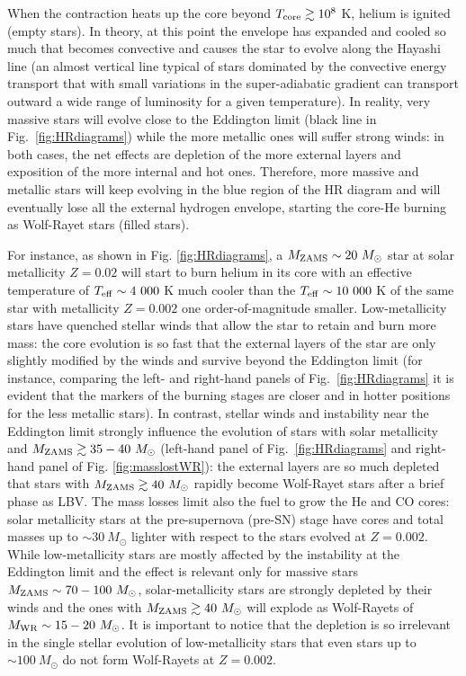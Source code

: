 \documentclass[a4paper,titlepage]{book}     	%
\newcommand{\sun}{\ensuremath{_\odot}}
\newcommand{\mzams}{M_\textup{ZAMS}}
\newcommand{\msun}{\ensuremath{M\sun}}
\begin{document}
When the contraction heats up the core beyond $T_{\rm core} \gtrsim 10^{8}$ K, helium is ignited (empty stars). In theory, at this point the envelope has expanded and cooled so much that becomes convective and causes the star to evolve along the Hayashi line (an almost vertical line typical of stars dominated by the convective energy transport that with small variations in the super-adiabatic gradient can transport outward a wide range of luminosity for a given temperature). In reality, very massive stars will evolve close to the Eddington limit (black line in Fig.\ \ref{fig:HRdiagrams}) while the more metallic ones will suffer strong winds: in both cases, the net effects are depletion of the more external layers and exposition of the more internal and hot ones. Therefore, more massive and metallic stars will keep evolving in the blue region of the HR diagram and will eventually lose all the external hydrogen envelope, starting the core-He burning as Wolf-Rayet stars (filled stars). 

For instance, as shown in Fig. \ref{fig:HRdiagrams}, a $\mzams \sim 20~\msun$ star at solar metallicity $Z=0.02$ will start to burn helium in its core with an effective temperature of $T_{\rm eff} \sim 4~000$ K much cooler than the $T_{\rm eff} \sim 10~000$ K of the same star with metallicity $Z=0.002$ one order-of-magnitude smaller. Low-metallicity stars have quenched stellar winds that allow the star to retain and burn more mass: the core evolution is so fast that the external layers of the star are only slightly modified by the winds and survive beyond the Eddington limit (for instance, comparing the left- and right-hand panels of Fig.\ \ref{fig:HRdiagrams} it is evident that the markers of the burning stages are closer and in hotter positions for the less metallic stars). In contrast, stellar winds and instability near the Eddington limit strongly influence the evolution of stars with solar metallicity and $\mzams \gtrsim 35-40~\msun$ (left-hand panel of Fig.\ \ref{fig:HRdiagrams} and right-hand panel of Fig. \ref{fig:masslostWR}): the external layers are so much depleted that stars with $\mzams \gtrsim 40~\msun$ rapidly become Wolf-Rayet stars after a brief phase as LBV. The mass losses limit also the fuel to grow the He and CO cores: solar metallicity stars at the pre-supernova (pre-SN) stage have cores and total masses up to $\sim 30~\msun$ lighter with respect to the stars evolved at $Z=0.002$. While low-metallicity stars are mostly affected by the instability at the Eddington limit and the effect is relevant only for massive stars $\mzams \sim 70-100~\msun$, solar-metallicity stars are strongly depleted by their winds and the ones with $\mzams \gtrsim 40~\msun$ will explode as Wolf-Rayets of $M_{\rm WR} \sim 15-20~\msun$. It is important to notice that the depletion is so irrelevant in the single stellar evolution of low-metallicity stars that even stars up to $\sim 100~\msun$ do not form Wolf-Rayets at $Z=0.002$.\\
\end{document}
